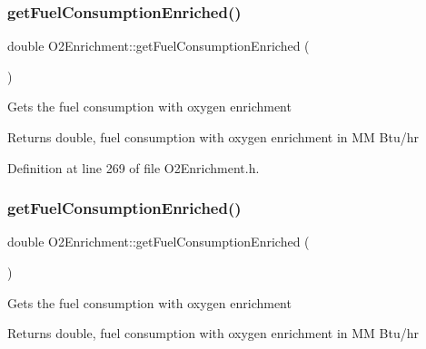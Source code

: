 \mbox{\label{class_o2_enrichment_aaf0dae071145b439e995d90f838878a7}} 
\subsubsection{\texorpdfstring{get\+Fuel\+Consumption\+Enriched()}{getFuelConsumptionEnriched()}\hspace{0.1cm}{\footnotesize\ttfamily [1/3]}}
{\footnotesize\ttfamily double O2\+Enrichment\+::get\+Fuel\+Consumption\+Enriched (\begin{DoxyParamCaption}{ }\end{DoxyParamCaption})\hspace{0.3cm}{\ttfamily [inline]}}

Gets the fuel consumption with oxygen enrichment \begin{DoxyReturn}{Returns}
double, fuel consumption with oxygen enrichment in MM Btu/hr 
\end{DoxyReturn}


Definition at line 269 of file O2\+Enrichment.\+h.

\mbox{\label{class_o2_enrichment_aaf0dae071145b439e995d90f838878a7}} 
\subsubsection{\texorpdfstring{get\+Fuel\+Consumption\+Enriched()}{getFuelConsumptionEnriched()}\hspace{0.1cm}{\footnotesize\ttfamily [2/3]}}
{\footnotesize\ttfamily double O2\+Enrichment\+::get\+Fuel\+Consumption\+Enriched (\begin{DoxyParamCaption}{ }\end{DoxyParamCaption})\hspace{0.3cm}{\ttfamily [inline]}}

Gets the fuel consumption with oxygen enrichment \begin{DoxyReturn}{Returns}
double, fuel consumption with oxygen enrichment in MM Btu/hr 
\end{DoxyReturn}


